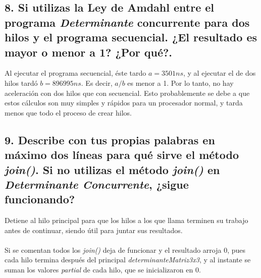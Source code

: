 \documentclass[12pt]{article}
\begin{document}
\subsection*{8. Si utilizas la Ley de Amdahl entre el programa \textit{Determinante} concurrente para dos hilos y el programa secuencial. ¿El resultado es mayor o menor a 1? ¿Por qué?.}

Al ejecutar el programa secuencial, éste tardo $a=3501 ns$, y al ejecutar el de dos hilos tardó $b=896995 ns$. Es decir, $a/b$ es menor a 1. Por lo tanto, no hay aceleración con dos hilos que con secuencial. Esto probablemente se debe a que estos cálculos son muy simples y rápidos para un procesador normal, y tarda menos que todo el proceso de crear hilos.

\subsection*{9. Describe con tus propias palabras en máximo dos líneas para qué sirve el método \textit{join()}. Si no
utilizas el método \textit{join()} en \textit{Determinante Concurrente}, ¿sigue funcionando?}

Detiene al hilo principal para que los hilos a los que llama terminen su trabajo antes de continuar, siendo útil para juntar sus resultados.
\\
\\
Si se comentan todos los \textit{join()} deja de funcionar y el resultado arroja 0, pues cada hilo termina después del principal \textit{determinanteMatriz3x3}, y al instante se suman los valores \textit{partial} de cada hilo, que se inicializaron en 0. 
\\
\end{document}
